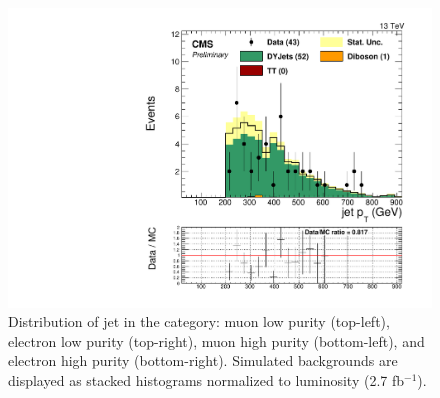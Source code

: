 \begin{figure}[h]
\begin{center}
\includegraphics[scale=0.37]{figures/control/ptZjjEHP.pdf}
\caption[Distribution of jet \ptrans]{Distribution of jet \ptrans in the category: muon low purity (top-left), electron low purity (top-right), muon high purity (bottom-left), and  electron high purity (bottom-right). Simulated backgrounds are displayed as stacked histograms normalized to luminosity (2.7 fb$^{-1}$).}
\label{ptZjj_VZ}
\end{center}
\end{figure}
